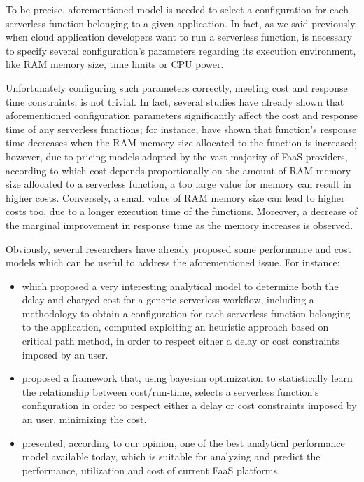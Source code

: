 \documentclass[12pt,a4paper]{report}
\begin{document}
To be precise, aforementioned model is needed to select a configuration for each serverless function belonging to a given application. In fact, as we said previously, when cloud application developers want to run a serverless function, is necessary to specify several configuration's parameters regarding its execution environment, like RAM memory size, time limits or CPU power.

Unfortunately configuring such parameters correctly, meeting cost and response time constraints, is not trivial. In fact, several studies have already shown that aforementioned configuration parameters significantly affect the cost and response time of any serverless functions; for instance, \citet{COSE} have shown that function's response time decreases when the RAM memory size allocated to the function is increased; however, due to pricing models adopted by the vast majority of FaaS providers, according to which cost depends proportionally on the amount of RAM memory size allocated to a serverless function, a too large value for memory can result in higher costs. Conversely, a small value of RAM memory size can lead to higher costs too, due to a longer execution time of the functions. Moreover, a decrease of the marginal improvement in response time as the memory increases is observed.

Obviously, several researchers have already proposed some  performance and cost models which can be useful to address the aforementioned issue. For instance: 

\begin{itemize}
	\item \citet{Modelling} which proposed a very interesting analytical model to determine both the delay and charged cost for a generic serverless workflow, including a methodology to obtain a configuration for each serverless function belonging to the application, computed exploiting an heuristic approach based on critical path method, in order to respect either a delay or cost constraints imposed by an user.
	
	\item \citet{COSE} proposed a framework that, using bayesian optimization to statistically learn the relationship between cost/run-time, selects a serverless function's configuration in order to respect either a delay or cost constraints imposed by an user, minimizing the cost.
	
	\item \citet{Modelling} presented, according to our opinion, one of the best analytical performance model available today, which is suitable for analyzing and predict the performance, utilization and cost of current FaaS platforms. 
	
\end{itemize}
\end{document}
